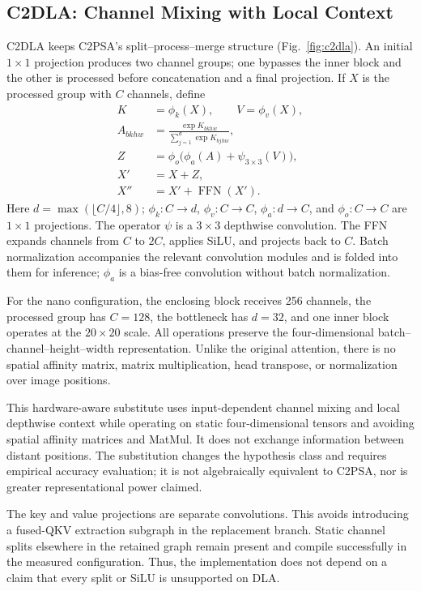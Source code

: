 \subsection{C2DLA: Channel Mixing with Local Context}
\label{sec:c2dla}

C2DLA keeps C2PSA's split--process--merge structure (Fig.~\ref{fig:c2dla}). An initial $1\times1$
projection produces two channel groups; one bypasses the inner block and the
other is processed before concatenation and a final projection. If $X$ is the
processed group with $C$ channels, define
\begin{align}
 K &= \phi_k(X), \qquad V=\phi_v(X), \label{eq:kv}\\
 A_{bkhw} &= \frac{\exp K_{bkhw}}{\sum_{j=1}^{d}\exp K_{bjhw}},
 \label{eq:chansoftmax}\\
 Z &= \phi_o\bigl(\phi_a(A)+\psi_{3\times3}(V)\bigr),
 \label{eq:mix}\\
 X' &= X+Z, \label{eq:res1}\\
 X'' &= X'+\operatorname{FFN}(X'). \label{eq:res2}
\end{align}
Here $d=\max(\lfloor C/4\rfloor,8)$; $\phi_k:C\to d$,
$\phi_v:C\to C$, $\phi_a:d\to C$, and $\phi_o:C\to C$ are
$1\times1$ projections. The operator $\psi$ is a $3\times3$ depthwise
convolution. The FFN expands channels from $C$ to $2C$, applies SiLU, and
projects back to $C$. Batch normalization accompanies the relevant convolution
modules and is folded into them for inference; $\phi_a$ is a bias-free
convolution without batch normalization.

For the nano configuration, the enclosing block receives 256 channels, the
processed group has $C=128$, the bottleneck has $d=32$, and one inner block
operates at the $20\times20$ scale. All operations preserve the four-dimensional
batch--channel--height--width representation. Unlike the original attention,
there is no spatial affinity matrix, matrix multiplication, head transpose,
or normalization over image positions.

This hardware-aware substitute uses input-dependent channel mixing and
local depthwise context while operating on static four-dimensional tensors and
avoiding spatial affinity matrices and MatMul. It does not exchange information
between distant positions. The substitution changes the hypothesis class and
requires empirical accuracy evaluation; it is not algebraically equivalent to
C2PSA, nor is greater representational power claimed.

The key and value projections are separate convolutions. This avoids introducing
a fused-QKV extraction subgraph in the replacement branch. Static channel
splits elsewhere in the retained graph remain present and compile successfully
in the measured configuration. Thus, the implementation does not depend on a
claim that every split or SiLU is unsupported on DLA.

